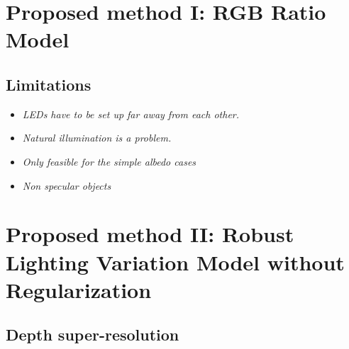 \section{Proposed method I: RGB Ratio Model}



\subsection{Limitations}
\begin{itemize}
\item \emph{LEDs have to be set up far away from each other.}
\item \emph{Natural illumination is a problem.}
\item \emph{Only feasible for the simple albedo cases}
\item \emph{Non specular objects}
\end{itemize}


\section{Proposed method II: Robust Lighting Variation Model without Regularization}

\subsection{Depth super-resolution}



